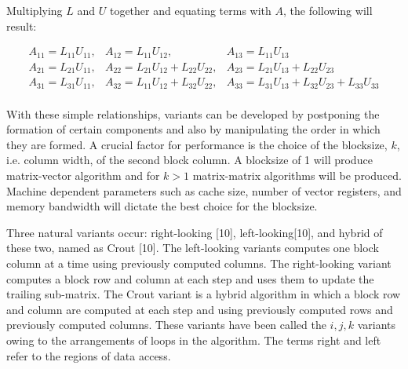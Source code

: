 Multiplying $L$ and $U$ together and equating terms with $A$, the following will result:


\begin{equation}
\begin{array}{lll}
A_{11} = L_{11}U_{11}, & A_{12} = L_{11}U_{12}, & A_{13} = L_{11}U_{13} \\
A_{21} = L_{21}U_{11}, & A_{22} = L_{21}U_{12}+L_{22}U_{22}, & A_{23} = L_{21}U_{13}+L_{22}U_{23}\\
A_{31} = L_{31}U_{11}, & A_{32} = L_{11}U_{12}+L_{32}U_{22}, & A_{33} = L_{31}U_{13}+L_{32}U_{23}+L_{33}U_{33}\\
\end{array}
\end{equation}

With these simple relationships, variants can be developed by postponing the formation of certain components and also by manipulating the order in which they
are formed. A crucial factor for performance is the choice of the blocksize, $k$, i.e. column width, of the second block column. A blocksize of 1 will produce
matrix-vector algorithm and for $k>1$ matrix-matrix algorithms will be produced. Machine dependent parameters such as cache size, number of vector registers,
and memory bandwidth will dictate the best choice for the blocksize. \par
\hspace{1in} Three natural variants occur: right-looking [10], left-looking[10], and hybrid of these two, named as Crout [10]. The left-looking variants
computes one block column at a time using previously computed columns. The right-looking variant computes a block row and column at each step and uses them to
update the trailing sub-matrix. The Crout variant is a hybrid algorithm in which a block row and column are computed at each step and using previously computed
rows and previously computed columns. These variants  have been called the $i,j,k$ variants owing to the arrangements of loops in the algorithm. The terms
right and left refer to the regions of data access.
